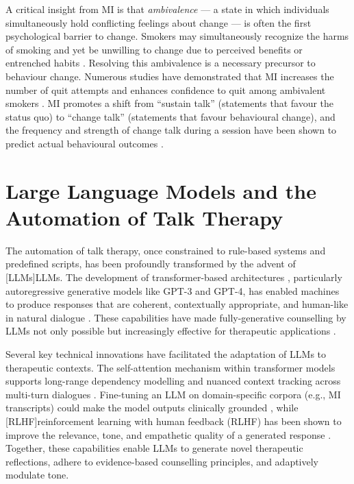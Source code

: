 A critical insight from MI is that \emph{ambivalence} --- a state in which individuals simultaneously hold conflicting feelings about change --- is often the first psychological barrier to change. Smokers may simultaneously recognize the harms of smoking and yet be unwilling to change due to perceived benefits or entrenched habits \cite{brown2023mi}. Resolving this ambivalence is a necessary precursor to behaviour change. Numerous studies have demonstrated that MI increases the number of quit attempts and enhances confidence to quit among ambivalent smokers \cite{Abar2013, Gwaltney2009-wj}. MI promotes a shift from ``sustain talk'' (statements that favour the status quo) to ``change talk'' (statements that favour behavioural change), and the frequency and strength of change talk during a session have been shown to predict actual behavioural outcomes \cite{apodaca2009mechanisms}.

\section{Large Language Models and the Automation of Talk Therapy}
The automation of talk therapy, once constrained to rule-based systems and predefined scripts, has been profoundly transformed by the advent of [LLMs]LLMs. The development of transformer-based architectures \cite{vaswani2017attention}, particularly autoregressive generative models like GPT-3 and GPT-4, has enabled machines to produce responses that are coherent, contextually appropriate, and human-like in natural dialogue \cite{openai2023gpt4}. These capabilities have made fully-generative counselling by LLMs not only possible but increasingly effective for therapeutic applications \cite{miner2020artificial, torous2023generative}.

Several key technical innovations have facilitated the adaptation of LLMs to therapeutic contexts. The self-attention mechanism within transformer models supports long-range dependency modelling and nuanced context tracking across multi-turn dialogues \cite{vaswani2017attention}. Fine-tuning an LLM on domain-specific corpora (e.g., MI transcripts) could make the model outputs clinically grounded \cite{valentino2024evaluating}, while [RLHF]reinforcement learning with human feedback (RLHF) has been shown to improve the relevance, tone, and empathetic quality of a generated response \cite{10.5555/3600270.3602281, gilson2023empathy}. Together, these capabilities enable LLMs to generate novel therapeutic reflections, adhere to evidence-based counselling principles, and adaptively modulate tone.




